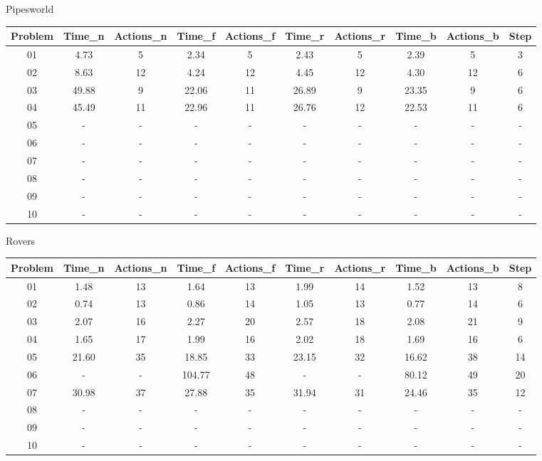 \documentclass{article}
\begin{document}
\begin{center}
\Large Pipesworld
\small
\label{tab-3}
\begin{tabular}{cccccccccc}
\toprule
Problem & Time\_n & Actions\_n & Time\_f & Actions\_f & Time\_r & Actions\_r & Time\_b & Actions\_b & Step \\
\midrule
01 & 4.73 & 5 & 2.34 & 5 & 2.43 & 5 & 2.39 & 5 & 3 \\
02 & 8.63 & 12 & 4.24 & 12 & 4.45 & 12 & 4.30 & 12 & 6 \\
03 & 49.88 & 9 & 22.06 & 11 & 26.89 & 9 & 23.35 & 9 & 6 \\
04 & 45.49 & 11 & 22.96 & 11 & 26.76 & 12 & 22.53 & 11 & 6 \\
05 & - & - & - & - & - & - & - & - & - \\
06 & - & - & - & - & - & - & - & - & - \\
07 & - & - & - & - & - & - & - & - & - \\
08 & - & - & - & - & - & - & - & - & - \\
09 & - & - & - & - & - & - & - & - & - \\
10 & - & - & - & - & - & - & - & - & - \\
\bottomrule
\end{tabular}
\end{center}

\begin{center}
\Large Rovers
\small
\label{tab-4}
\begin{tabular}{cccccccccc}
\toprule
Problem & Time\_n & Actions\_n & Time\_f & Actions\_f & Time\_r & Actions\_r & Time\_b & Actions\_b & Step \\
\midrule
01 & 1.48 & 13 & 1.64 & 13 & 1.99 & 14 & 1.52 & 13 & 8 \\
02 & 0.74 & 13 & 0.86 & 14 & 1.05 & 13 & 0.77 & 14 & 6 \\
03 & 2.07 & 16 & 2.27 & 20 & 2.57 & 18 & 2.08 & 21& 9 \\
04 & 1.65 & 17 & 1.99 & 16 & 2.02 & 18 & 1.69 & 16& 6 \\
05 & 21.60 & 35 & 18.85 & 33 & 23.15 & 32 & 16.62 & 38 & 14 \\
06 & - & - & 104.77 & 48 & - & - & 80.12 & 49 & 20 \\
07 & 30.98 & 37 & 27.88 & 35 & 31.94 & 31 & 24.46 & 35 & 12 \\
08 & - & - & - & - & - & - & - & -& - \\
09 & - & - & - & - & - & - & - & - & - \\
10 & - & - & - & - & - & - & - & - & - \\
\bottomrule
\end{tabular}
\end{center}
\end{document}
